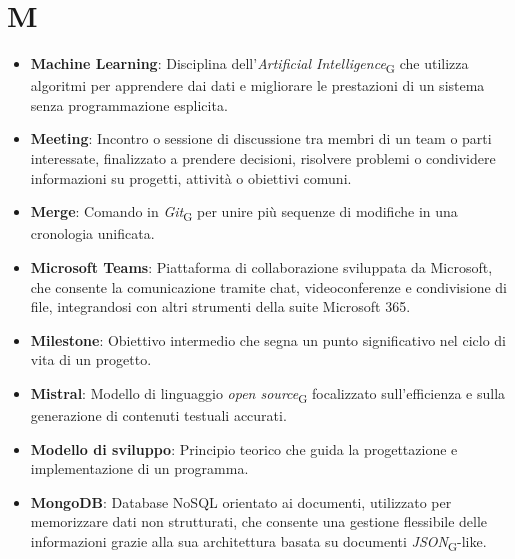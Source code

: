 \section{M}
\begin{itemize}
    \item \textbf{Machine Learning}: Disciplina dell'\textit{Artificial Intelligence}\textsubscript{G} che utilizza algoritmi per apprendere dai dati e migliorare le prestazioni di un sistema senza programmazione esplicita.
    \item \textbf{Meeting}: Incontro o sessione di discussione tra membri di un team o parti interessate, finalizzato a prendere decisioni, risolvere problemi o condividere informazioni su progetti, attività o obiettivi comuni.
    \item \textbf{Merge}: Comando in \textit{Git}\textsubscript{G} per unire più sequenze di modifiche in una cronologia unificata.
    \item \textbf{Microsoft Teams}: Piattaforma di collaborazione sviluppata da Microsoft, che consente la comunicazione tramite chat, videoconferenze e condivisione di file, integrandosi con altri strumenti della suite Microsoft 365.
    \item \textbf{Milestone}: Obiettivo intermedio che segna un punto significativo nel ciclo di vita di un progetto.
    \item \textbf{Mistral}: Modello di linguaggio \textit{open source}\textsubscript{G} focalizzato sull'efficienza e sulla generazione di contenuti testuali accurati.
    \item \textbf{Modello di sviluppo}: Principio teorico che guida la progettazione e implementazione di un programma.
    \item \textbf{MongoDB}: Database NoSQL orientato ai documenti, utilizzato per memorizzare dati non strutturati, che consente una gestione flessibile delle informazioni grazie alla sua architettura basata su documenti \textit{JSON}\textsubscript{G}-like.
\end{itemize}
